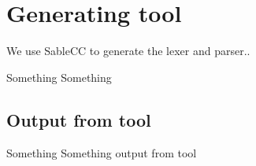 \chapter{Generating tool}

We use SableCC to generate the lexer and parser..

Something Something

\section{Output from tool}

Something Something output from tool